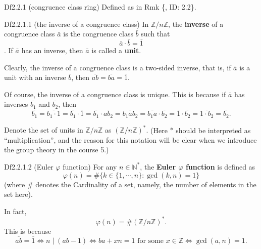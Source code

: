 \documentclass{article}
\begin{document}
\begin{Df}{Df2.2.1 (congruence class ring)}
    Defined as in Rmk \{, ID: 2.2\}.
\end{Df}

\begin{Df}{Df2.2.1.1 (the inverse of a congruence class)}
    In $\mathbb{Z}/n\mathbb{Z}$, the \textbf{inverse} of a congruence class $\bar{a}$ is the congruence class $\bar{b}$ such that
    $$ \bar{a}\cdot \bar{b} = \bar{1} $$.
    If $\bar{a}$ has an inverse, then $\bar{a}$ is called a \textbf{unit}.
\end{Df}

\begin{Rmk}{}
    \begin{compactenum}
        \item \textcolor{Th}{Clearly, the inverse of a congruence class is a two-sided inverse, that is, if $\bar{a}$ is a unit with an inverse $\bar{b}$, then $\overline{ab} = \overline{ba} = \overline{1}$.} 
        \item \textcolor{Th}{Of course, the inverse of a congruence class is unique.} This is because if $\bar{a}$ has inverses $\overline{b_1}$ and $\overline{b_2}$, then
        $$ \overline{b_1} = \overline{b_1\cdot 1} = \overline{b_1}\cdot \overline{1} = \overline{b_1}\cdot \overline{ab_2} = \overline{b_1ab_2} = \overline{b_1a}\cdot \overline{b_2} = \overline{1}\cdot \overline{b_2} = \overline{1\cdot b_2} = \overline{b_2}. $$
        \item \textcolor{Df}{Denote the set of units in $\mathbb{Z}/n\mathbb{Z}$ as $(\mathbb{Z}/n\mathbb{Z})^\ast$.} (Here $\ast$ should be interpreted as ``multiplication'', and the reason for this notation will be clear when we introduce the group theory in the course 5.)
    \end{compactenum}
\end{Rmk}

\begin{Df}{Df2.2.1.2 (Euler $\varphi$ function)}
    For any $n\in\mathbb{N}^\ast$, the \textbf{Euler $\varphi$ function} is defined as
    $$ \varphi(n) = \# \{k\in\{1, \cdots, n\}: \gcd(k, n) = 1\} $$
    (where $\#$ denotes the Cardinality of a set, namely, the number of elements in the set here).
\end{Df}

\begin{Rmk}{}
    \textcolor{Th}{In fact,
    $$ \varphi(n) = \# (\mathbb{Z}/n\mathbb{Z})^\ast. $$}
    This is because 
    $$ \overline{ab} = \overline{1} \Leftrightarrow n\mid (ab-1) \Leftrightarrow ba + xn = 1 \text{ for some } x\in\mathbb{Z} \Leftrightarrow \gcd(a, n) = 1. $$
\end{Rmk}
\end{document}

